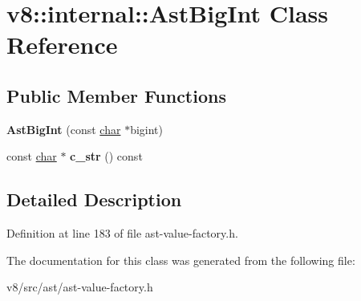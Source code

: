 \hypertarget{classv8_1_1internal_1_1AstBigInt}{}\section{v8\+:\+:internal\+:\+:Ast\+Big\+Int Class Reference}
\label{classv8_1_1internal_1_1AstBigInt}
\subsection*{Public Member Functions}
\begin{DoxyCompactItemize}
\item 
\mbox{\label{classv8_1_1internal_1_1AstBigInt_a1915e05e6459fa0ca0de01433873bd94}} 
{\bfseries Ast\+Big\+Int} (const \mbox{\hyperlink{classchar}{char}} $\ast$bigint)
\item 
\mbox{\label{classv8_1_1internal_1_1AstBigInt_aeef5b6650c58e21aa989f8deda6d95b5}} 
const \mbox{\hyperlink{classchar}{char}} $\ast$ {\bfseries c\+\_\+str} () const
\end{DoxyCompactItemize}


\subsection{Detailed Description}


Definition at line 183 of file ast-\/value-\/factory.\+h.



The documentation for this class was generated from the following file\+:\begin{DoxyCompactItemize}
\item 
v8/src/ast/ast-\/value-\/factory.\+h\end{DoxyCompactItemize}
